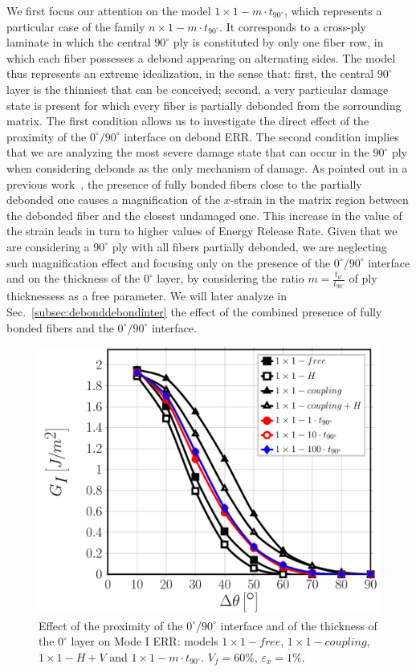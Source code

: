 \documentclass[review]{elsarticle}
\begin{document}
We first focus our attention on the model $1\times 1-m\cdot t_{90^{\circ}}$, which represents a particular case of the family $n\times 1-m\cdot t_{90^{\circ}}$. It corresponds to a cross-ply laminate in which the central $90^{\circ}$ ply is constituted by only one fiber row, in which each fiber possesses a debond appearing on alternating sides. The model thus represents an extreme idealization, in the sense that: first, the central $90^{\circ}$ layer is the thinniest that can be conceived; second, a very particular damage state is present for which every fiber is partially debonded from the sorrounding matrix. The first condition allows us to investigate the direct effect of the proximity of the $0^{\circ}/90^{\circ}$ interface on debond ERR. The second condition implies that we are analyzing the most severe damage state that can occur in the $90^{\circ}$ ply when considering debonds as the only mechanism of damage. As pointed out in a previous work~\cite{DiStasio2019}, the presence of fully bonded fibers close to the partially debonded one causes a magnification of the $x$-strain in the matrix region between the debonded fiber and the closest undamaged one. This increase in the value of the strain leads in turn to higher values of Energy Release Rate. Given that we are considering a $90^{\circ}$ ply with all fibers partially debonded, we are neglecting such magnification effect and focusing only on the presence of the $0^{\circ}/90^{\circ}$ interface and on the thickness of the $0^{\circ}$ layer, by considering the ratio $m=\frac{t_{0^{\circ}}}{t_{90^{\circ}}}$ of ply thicknessess as a free parameter. We will later analyze in Sec.~\ref{subsec:debonddebondinter} the effect of the combined presence of fully bonded fibers and the $0^{\circ}/90^{\circ}$ interface.

\begin{figure}[!h]
\centering
\includegraphics[width=\textwidth]{1x1-i-vf60-GI.pdf}
\caption{Effect of the proximity of the $0^{\circ}/90^{\circ}$ interface and of the thickness of the $0^{\circ}$ layer on Mode I ERR: models $1\times 1-free$, $1\times 1-coupling$, $1\times 1-H+V$ and $1\times 1-m\cdot t_{90^{\circ}}$. $V_{f}=60\%$, $\varepsilon_{x}=1\%$.}\label{fig:thicknessGI}
\end{figure}
\end{document}
